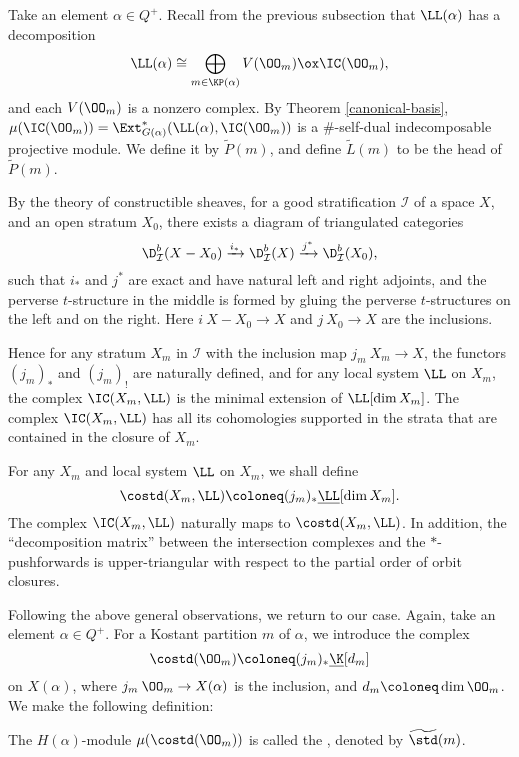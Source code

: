 Take an element $\alpha\in Q^+$.
Recall from the previous subsection that $\LL(\alpha)$
has a decomposition $$\LL(\alpha)\cong\bigoplus_{m\in\KP(\alpha)}
V(\OO_m)\ox\IC(\OO_m),$$ and each $V(\OO_m)$ is a nonzero complex.
By Theorem \ref{canonical-basis},
$\mu(\IC(\OO_m)) = \Ext^*_{G(\alpha)}(\LL(\alpha),
\IC(\OO_m))$ is a $\#$-self-dual indecomposable projective module.
We define it by $\widetilde{P}(m)$, and define
$\widetilde{L}(m)$ to be the head of $\widetilde{P}(m)$.

By the theory of constructible sheaves, for a good stratification
$\mathcal{I}$ of a space $X$, and an open stratum $X_0$,
there exists a diagram of triangulated categories
\[
    \D^b_{\mathcal{I}}(X-X_0)\xrightarrow{i_*}\D^b_{\mathcal{I}}(X)\xrightarrow{j^*}\D^b_{\mathcal{I}}(X_0),
\]
such that $i_*$ and $j^*$ are exact and have natural left and right adjoints,
and the perverse $t$-structure in the middle is formed by gluing
the perverse $t$-structures on the left and on the right.
Here $i\:X-X_0\to X$ and $j\:X_0\to X$ are the inclusions.

Hence for any stratum $X_m$ in $\mathcal{I}$ with the inclusion map $j_m\:X_m\to X$, the functors
$(j_m)_*$ and $(j_m)_!$ are naturally defined, and for any 
local system $\LL$ on $X_m$, the complex $\IC(X_m,\LL)$
is the minimal extension of $\LL[\dim X_m]$. The complex $\IC(X_m,\LL)$
has all its cohomologies supported in the strata that are
contained in the closure of $X_m$.

For any $X_m$ and local system $\LL$ on $X_m$, we shall define
\[
    \costd(X_m,\LL) \coloneq  (j_m)_*\underline{\LL}[\dim X_m].
\]
The complex $\IC(X_m,\LL)$ naturally maps to $\costd(X_m,\LL)$.
In addition, the ``decomposition matrix'' between the
intersection complexes and the $*$-pushforwards
is upper-triangular with respect to the partial order of orbit closures.

Following the above general observations, we return to our case.
Again, take an element $\alpha\in Q^+$. For a Kostant partition $m$ of $\alpha$,
we introduce the complex $$\costd(\OO_m) \coloneq  
(j_m)_*\underline{\K}[d_m]$$ on $X(\alpha)$, where
$j_m\:\OO_m\to X(\alpha)$ is the inclusion, and $d_m \coloneq  \dim \OO_m$.
We make the following definition:

\begin{definition}
    The $H(\alpha)$-module $\mu(\costd(\OO_m))$ is called the
    , denoted by $\widetilde{\std}(m)$.
\end{definition}

